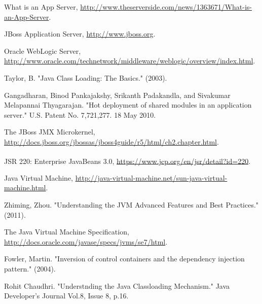 \documentclass[conference]{IEEEtran}
\begin{document}
\begin{thebibliography}{9}

What is an App Server, \url{http://www.theserverside.com/news/1363671/What-is-an-App-Server}.

JBoss Application Server, \url{http://www.jboss.org}.

Oracle WebLogic Server, \url{http://www.oracle.com/technetwork/middleware/weblogic/overview/index.html}.


Taylor, B. "Java Class Loading: The Basics." (2003).

Gangadharan, Binod Pankajakshy, Srikanth Padakandla, and Sivakumar Melapannai Thyagarajan. "Hot deployment of shared modules in an application server." U.S. Patent No. 7,721,277. 18 May 2010.

The JBoss JMX Microkernel, \url{http://docs.jboss.org/jbossas/jboss4guide/r5/html/ch2.chapter.html}.

JSR 220: Enterprise JavaBeans\textsuperscript{\texttrademark} 3.0, \url{https://www.jcp.org/en/jsr/detail?id=220}.

Java Virtual Machine, \url{http://java-virtual-machine.net/sun-java-virtual-machine.html}.

Zhiming, Zhou. "Understanding the JVM Advanced Features and Best Practices." (2011).

The Java Virtual Machine Specification, \url{http://docs.oracle.com/javase/specs/jvms/se7/html}.

Fowler, Martin. "Inversion of control containers and the dependency injection pattern." (2004).


Rohit Chaudhri. "Understnding the Java Classloading Mechanism." Java Developer's Journal Vol.8, Issue 8, p.16.


\end{thebibliography}
\end{document}
